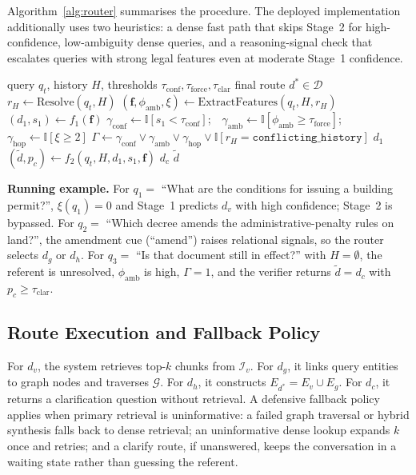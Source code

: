 \documentclass[pdflatex,sn-mathphys-num]{sn-jnl}
\begin{document}
Algorithm~\ref{alg:router} summarises the procedure. The deployed
implementation additionally uses two heuristics: a dense fast path that skips
Stage~2 for high-confidence, low-ambiguity dense queries, and a
reasoning-signal check that escalates queries with strong legal features even
at moderate Stage~1 confidence.

\begin{algorithm}[!htbp]
\caption{Two-stage adaptive router}\label{alg:router}
\begin{algorithmic}[1]
\Require query $q_t$, history $H$, thresholds $\tau_{\mathrm{conf}},\tau_{\mathrm{force}},\tau_{\mathrm{clar}}$
\Ensure final route $d^*\in\mathcal{D}$
\State $r_H \gets \mathrm{Resolve}(q_t,H)$
\State $(\mathbf{f},\phi_{\mathrm{amb}},\xi) \gets \mathrm{ExtractFeatures}(q_t,H,r_H)$
\State $(d_1,s_1) \gets f_1(\mathbf{f})$
\State $\gamma_{\mathrm{conf}}\gets\mathbb{I}[s_1<\tau_{\mathrm{conf}}]$;\ \ $\gamma_{\mathrm{amb}}\gets\mathbb{I}[\phi_{\mathrm{amb}}\ge\tau_{\mathrm{force}}]$;\ \ $\gamma_{\mathrm{hop}}\gets\mathbb{I}[\xi\ge 2]$
\State $\Gamma \gets \gamma_{\mathrm{conf}}\vee\gamma_{\mathrm{amb}}\vee\gamma_{\mathrm{hop}}\vee\mathbb{I}[r_H=\texttt{conflicting\_history}]$
  \State \Return $d_1$
\EndIf
\State $(\tilde{d},p_c) \gets f_2(q_t,H,d_1,s_1,\mathbf{f})$
  \State \Return $d_c$
\Else
  \State \Return $\tilde{d}$ 
\EndIf
\end{algorithmic}
\end{algorithm}

\noindent\textbf{Running example.}
For $q_1=$ ``What are the conditions for issuing a building permit?'',
$\xi(q_1)=0$ and Stage~1 predicts $d_v$ with high confidence; Stage~2 is
bypassed. For $q_2=$ ``Which decree amends the administrative-penalty rules
on land?'', the amendment cue (``amend'') raises relational signals, so the
router selects $d_g$ or $d_h$. For $q_3=$ ``Is that document still in
effect?'' with $H=\emptyset$, the referent is unresolved,
$\phi_{\mathrm{amb}}$ is high, $\Gamma=1$, and the verifier returns
$\tilde{d}=d_c$ with $p_c\ge\tau_{\mathrm{clar}}$.

\subsection{Route Execution and Fallback Policy}\label{subsec:route_execution}

For $d_v$, the system retrieves top-$k$ chunks from $\mathcal{I}_v$. For
$d_g$, it links query entities to graph nodes and traverses $\mathcal{G}$. For
$d_h$, it constructs $E_{d^*}=E_v\cup E_g$. For $d_c$, it returns a
clarification question without retrieval. A defensive fallback policy applies
when primary retrieval is uninformative: a failed graph traversal or hybrid
synthesis falls back to dense retrieval; an uninformative dense lookup expands
$k$ once and retries; and a clarify route, if unanswered, keeps the
conversation in a waiting state rather than guessing the referent.
\end{document}

